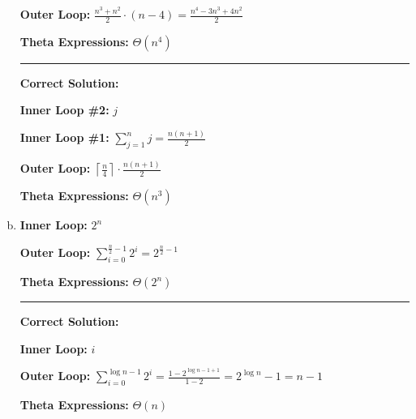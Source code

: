 \documentclass[12pt]{article}
\begin{document}
\begin{enumerate}[a.]
    \textbf{Outer Loop:} $\displaystyle\frac{n^3 + n^2}{2} \cdot (n - 4) = \displaystyle\frac{n^4 - 3n^3 + 4n^2}{2}$

    \textbf{Theta Expressions:} $\Theta (n^4)$

    \noindent\rule{\textwidth}{1pt}

    \textbf{Correct Solution:}

    \bigskip

    \textbf{Inner Loop \#2:} $j$

    \textbf{Inner Loop \#1:} $\sum\limits_{j=1}^n j = \displaystyle\frac{n(n+1)}{2}$

    \textbf{Outer Loop:} $\left\lceil \displaystyle\frac{n}{4} \right\rceil \cdot \displaystyle\frac{n(n+1)}{2}$

    \textbf{Theta Expressions:} $\Theta (n^3)$
    \item

    \textbf{Inner Loop:} $2^n$

    \textbf{Outer Loop:} $\displaystyle\sum\limits_{i=0}^{\frac{n}{2} - 1} 2^i = 2^{\frac{n}{2} - 1}$

    \textbf{Theta Expressions:} $\Theta (2^n)$

    \noindent\rule{\textwidth}{1pt}

    \textbf{Correct Solution:}

    \bigskip

    \textbf{Inner Loop:} $i$

    \textbf{Outer Loop:} $\sum\limits_{i=0}^{\log n - 1} 2^i = \displaystyle\frac{1 - 2^{\log n - 1 + 1}}{1 - 2} = 2^{\log n} - 1 = n - 1$

    \textbf{Theta Expressions:} $\Theta (n)$


\end{enumerate}
\end{document}
